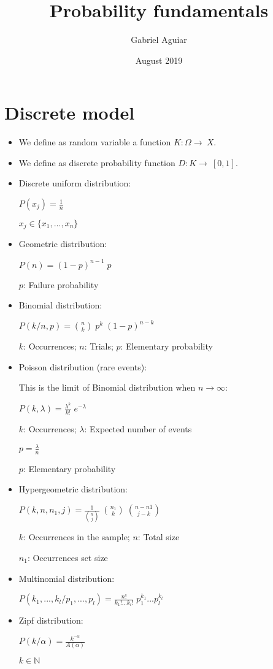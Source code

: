 \documentclass{article}
\title{Probability fundamentals}
\author{Gabriel Aguiar}
\date{August 2019}
\begin{document}
\maketitle

\section{Discrete model}

\begin{itemize}

\item We define as random variable a function $K: \Omega \rightarrow\ X$.

\item We define as discrete probability function $D: K \rightarrow\ [0, 1]$.

\item Discrete uniform distribution:

$P( x_{j} ) = \frac{1}{n}$

$x_{j} \in\{x_{1},..., x_{n}\}$

\item Geometric distribution:

$P(n) = (1 - p)^{n - 1} \; p$

$p$: Failure probability

\item Binomial distribution:

$P(k/n,p) = \binom{n}{k} \; p^{k} \; (1 - p)^{n - k}$

$k$: Occurrences; $n$: Trials; $p$: Elementary probability

\item Poisson distribution (rare events):

This is the limit of Binomial distribution when $n \rightarrow \infty$:

$P(k,\lambda) = \frac{\lambda^{k}}{k!} \; e^{-\lambda}$

$k$: Occurrences; $\lambda$: Expected number of events

$p = \frac{\lambda}{n}$

$p$: Elementary probability

\item Hypergeometric distribution:

$P(k,n,n_{1},j) = \frac{1}{\binom{n}{j}} \; \binom{n_{1}}{k} \; \binom{n - n{1}}{j - k}$

$k$: Occurrences in the sample; $n$: Total size

$n_{1}$: Occurrences set size

\break

\item Multinomial distribution:

$P(k_{1},...,k_{l}/p_{1},...,p_{l}) = \frac{n!}{k_{1}!...k_{l}!} \; p_{1}^{k_{1}}...p_{l}^{k_{l}}$

\item Zipf distribution:

$P(k/\alpha) = \frac{k^{-\alpha}}{A(\alpha)}$

$k \in \mathbb{N}$
        
\end{itemize}
\end{document}
